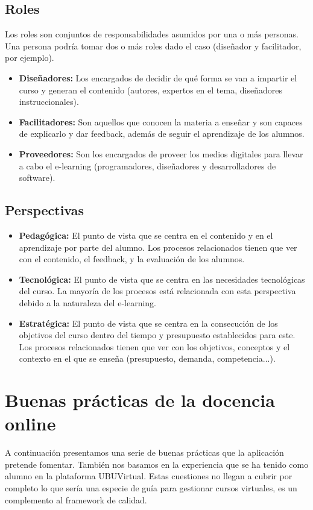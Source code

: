 
\subsection{Roles}
Los roles son conjuntos de responsabilidades asumidos por una o más personas. Una persona podría tomar dos o más roles dado el caso (diseñador y facilitador, por ejemplo).
\begin{itemize}
	\item \textbf{Diseñadores:}
	Los encargados de decidir de qué forma se van a impartir el curso y generan el contenido (autores, expertos en el tema, diseñadores instruccionales).
	\item \textbf{Facilitadores:}
	Son aquellos que conocen la materia a enseñar y son capaces de explicarlo y dar feedback, además de seguir el aprendizaje de los alumnos.
	\item \textbf{Proveedores:}
	Son los encargados de proveer los medios digitales para llevar a cabo el e-learning (programadores, diseñadores y desarrolladores de software).
\end{itemize}


\subsection{Perspectivas}
\begin{itemize}
	\item \textbf{Pedagógica:}
	El punto de vista que se centra en el contenido y en el aprendizaje por parte del alumno. Los procesos relacionados tienen que ver con el contenido, el feedback, y la evaluación de los alumnos.
	\item \textbf{Tecnológica:}
	El punto de vista que se centra en las necesidades tecnológicas del curso. La mayoría de los procesos está relacionada con esta perspectiva debido a la naturaleza del e-learning.
	\item \textbf{Estratégica:}
	El punto de vista que se centra en la consecución de los objetivos del curso dentro del tiempo y presupuesto establecidos para este. Los procesos relacionados tienen que ver con los objetivos, conceptos y el contexto en el que se enseña (presupuesto, demanda, competencia...).
\end{itemize}

\section{Buenas prácticas de la docencia online}
A continuación presentamos una serie de buenas prácticas que la aplicación pretende fomentar. También nos basamos en la experiencia que se ha tenido como alumno en la plataforma UBUVirtual. Estas cuestiones no llegan a cubrir por completo lo que sería una especie de guía para gestionar cursos virtuales, es un complemento al framework de calidad.
